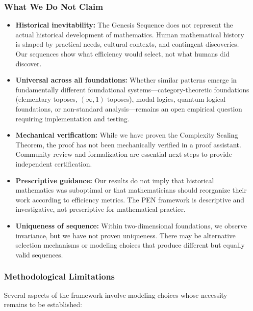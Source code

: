 \documentclass[11pt]{article}
\theoremstyle{definition}
\theoremstyle{remark}
\begin{document}
\subsubsection{What We Do Not Claim}

\begin{itemize}
\item \textbf{Historical inevitability:} The Genesis Sequence does not represent the actual historical
development of mathematics. Human mathematical history is shaped by practical needs, cultural
contexts, and contingent discoveries. Our sequences show what efficiency would select, not what
humans did discover.

\item \textbf{Universal across all foundations:} Whether similar patterns emerge in fundamentally
different foundational systems---category-theoretic foundations (elementary toposes, $(\infty,1)$-toposes),
modal logics, quantum logical foundations, or non-standard analysis---remains an open empirical
question requiring implementation and testing.

\item \textbf{Mechanical verification:} While we have proven the Complexity Scaling Theorem,
the proof has not been mechanically verified in a proof assistant. Community review and formalization
are essential next steps to provide independent certification.

\item \textbf{Prescriptive guidance:} Our results do not imply that historical mathematics was
suboptimal or that mathematicians should reorganize their work according to efficiency metrics.
The PEN framework is descriptive and investigative, not prescriptive for mathematical practice.

\item \textbf{Uniqueness of sequence:} Within two-dimensional foundations, we observe invariance,
but we have not proven uniqueness. There may be alternative selection mechanisms or modeling
choices that produce different but equally valid sequences.
\end{itemize}

\subsubsection{Methodological Limitations}

Several aspects of the framework involve modeling choices whose necessity remains to be established:
\end{document}

